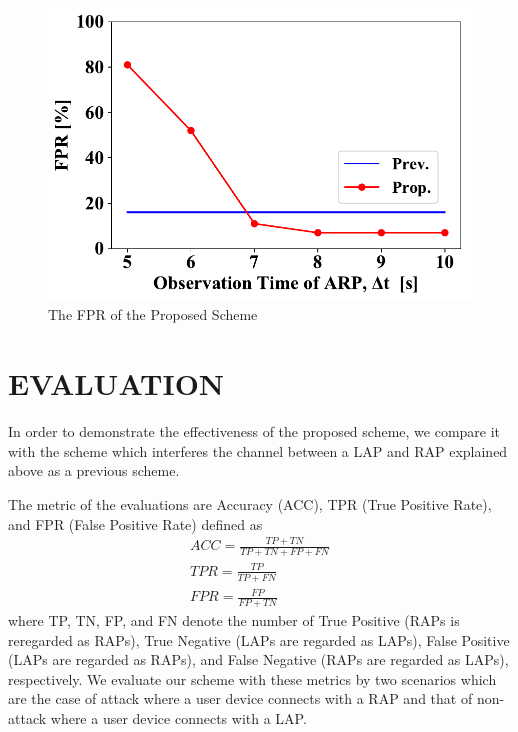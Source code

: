 \documentclass[conference]{IEEEtran}
\begin{document}
\begin{figure}[ht]
\begin{minipage}{0.33\hsize}
        \begin{center}
            \includegraphics[scale=0.4]{image/FPR.pdf}
        \end{center}
        \caption{The FPR of the Proposed Scheme}
        \label{fig:fpr}
    \end{minipage}

\end{figure}

\section{EVALUATION}\label{sec:5}
In order to demonstrate the effectiveness of the proposed scheme, we compare it with the scheme \cite{previous} which interferes the channel between a LAP and RAP explained above as a previous scheme.

The metric of the evaluations are Accuracy (ACC), TPR (True Positive Rate), and FPR (False Positive Rate) defined as
\begin{gather}
    ACC = \frac{TP + TN}{TP + TN + FP + FN} \\
    TPR = \frac{TP}{TP + FN} \\
    FPR = \frac{FP}{FP + TN}
\end{gather}
where TP, TN, FP, and FN denote the number of True Positive (RAPs is reregarded as RAPs), True Negative (LAPs are regarded as LAPs), False Positive (LAPs are regarded as RAPs), and False Negative (RAPs are regarded as LAPs), respectively.
We evaluate our scheme with these metrics by two scenarios which are the case of attack where a user device connects with a RAP and that of non-attack where a user device connects with a LAP.
\end{document}
